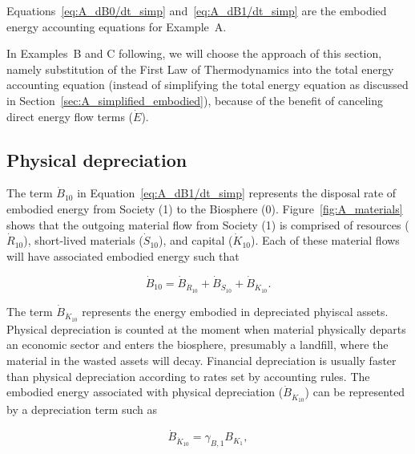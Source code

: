 \noindent{}Equations~\ref{eq:A_dB0/dt_simp} and~\ref{eq:A_dB1/dt_simp} are 
the embodied energy accounting equations for Example~A.

In Examples~B and C following, we will choose the approach of 
this section, namely substitution of the 
First Law of Thermodynamics into the total energy accounting equation
(instead of simplifying the total energy equation 
as discussed in Section~\ref{sec:A_simplified_embodied}),
because of the benefit of canceling direct energy flow terms ($\dot{E}$). 


\subsection{Physical depreciation}
\label{sec:depreciation_embodied}

The term $\dot{B}_{10}$ in Equation~\ref{eq:A_dB1/dt_simp}
represents the disposal rate 
of embodied energy from Society (1) to the Biosphere (0). 
Figure~\ref{fig:A_materials} shows that the outgoing material flow
from Society (1) is comprised of 
resources ($\dot{R}_{10}$),
short-lived materials ($\dot{S}_{10}$), and 
capital ($\dot{K}_{10}$). 
Each of these material flows will have associated embodied energy such that

\begin{equation} \label{eq:A-depreciation-of-B}
	\dot{B}_{10}
	= \dot{B}_{\dot{R}_{10}}
	+ \dot{B}_{\dot{S}_{10}}
	+ \dot{B}_{\dot{K}_{10}}.
\end{equation}

The term $\dot{B}_{\dot{K}_{10}}$ represents the energy embodied
in depreciated phyiscal assets.
Physical depreciation 
is counted at the moment when material physically departs an economic sector 
and enters the biosphere, presumably a landfill, 
where the material in the wasted assets will decay.
Financial depreciation
is usually faster than physical depreciation
according to rates set by accounting rules.
The embodied energy associated with physical depreciation ($\dot{B}_{\dot{K}_{10}}$)
can be represented by a depreciation term such as

\begin{equation} \label{eq:depreciation_term_defined}
	\dot{B}_{\dot{K}_{10}} 
	= \gamma_{B,1} B_{K_{1}},
\end{equation}


